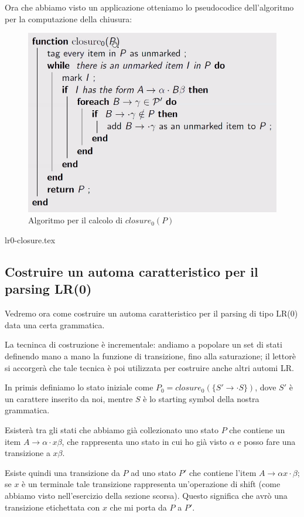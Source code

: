 \documentclass[class=book, crop=false, oneside, 12pt]{standalone}
\begin{document}
Ora che abbiamo visto un applicazione otteniamo lo pseudocodice dell'algoritmo per la
computazione della chiusura:
\begin{figure}[H]
    \centering
    \includegraphics[width=.8\textwidth]{bottom-up-parsing_closure_algorithm.png}
    \caption{Algoritmo per il calcolo di \(closure_0(P)\)}
\end{figure}
{lr0-closure.tex}

\subsection{Costruire un automa caratteristico per il parsing LR(0)}

Vedremo ora come costruire un automa caratteristico per il parsing di tipo LR(0) data una certa grammatica.

La tecninca di costruzione è incrementale: andiamo a popolare un set di stati definendo mano a mano la funzione di transizione, fino alla saturazione; il lettorè si accorgerà che tale tecnica è poi utilizzata per costruire anche altri automi LR.

In primis definiamo lo stato iniziale come \(P_0 = closure_0 (\{S' \to \cdot S\})\), dove \(S'\) è un carattere inserito da noi, mentre \(S\) è lo starting symbol della nostra grammatica.

Esisterà tra gli stati che abbiamo già collezionato uno stato \(P\) che contiene un item \(A \to \alpha \cdot x \beta\), che rappresenta uno stato in cui ho già visto \(\alpha\) e posso fare una transizione a \(x\beta\).

Esiste quindi una transizione da \(P\) ad uno stato \(P'\) che contiene l'item \(A \to \alpha x \cdot \beta\); se \(x\) è un terminale tale transizione rappresenta un'operazione di shift (come abbiamo visto nell'esercizio della sezione scorsa). 
Questo significa che avrò una transizione etichettata con \(x\) che mi porta da \(P\) a \(P'\).
\end{document}
